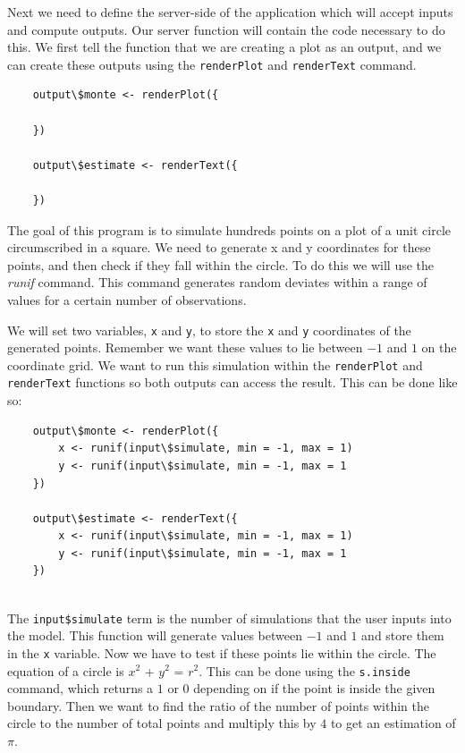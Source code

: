 \noindent
Next we need to define the server-side of the application which will accept inputs and compute outputs.
Our server function will contain the code necessary to do this.
We first tell the function that we are creating a plot as an output, and we can create these outputs using the \texttt{renderPlot} and \texttt{renderText} command.

\begin{lstlisting}
    output\$monte <- renderPlot({
        
    })
    
    output\$estimate <- renderText({
    
    })
\end{lstlisting}
 
\noindent The goal of this program is to simulate hundreds points on a plot of a unit circle circumscribed in a square.
We need to generate x and y coordinates for these points, and then check if they fall within the circle.
To do this we will use the \textit{runif} command.
This command generates random deviates within a range of values for a certain number of observations.

\noindent We will set two variables, \texttt{x} and \texttt{y}, to store the \texttt{x} and \texttt{y} coordinates of the generated points.
Remember we want these values to lie between $-1$ and $1$ on the coordinate grid.
We want to run this simulation within the \texttt{renderPlot} and \texttt{renderText} functions so both outputs can access the result.
This can be done like so: 

\begin{lstlisting}
    output\$monte <- renderPlot({
        x <- runif(input\$simulate, min = -1, max = 1)
        y <- runif(input\$simulate, min = -1, max = 1
    })
    
    output\$estimate <- renderText({
        x <- runif(input\$simulate, min = -1, max = 1)
        y <- runif(input\$simulate, min = -1, max = 1
    })
   
\end{lstlisting}

\noindent The \texttt{input\$simulate} term is the number of simulations that the user inputs into the model.
This function will generate values between $-1$ and $1$ and store them in the \texttt{x} variable.
Now we have to test if these points lie within the circle. The equation of a circle is $x^{2}$ + $y^{2}$ = $r^{2}$.
This can be done using the \texttt{s.inside} command, which returns a $1$ or $0$ depending on if the point is inside the given boundary.
Then we want to find the ratio of the number of points within the circle to the number of total points and multiply this by $4$ to get an estimation of $\pi$. 

